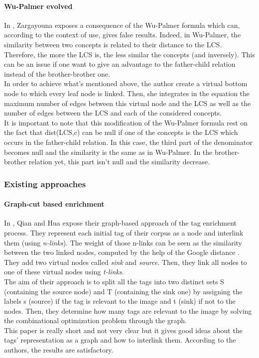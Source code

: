 \paragraph{Wu-Palmer evolved} %
\label{par:wu_palmer_evolved}
In \cite{zara}, Zargayouna exposes a consequence of the Wu-Palmer formula which can, according to the context of use, gives false results. Indeed, in Wu-Palmer, the similarity between two concepts is related to their distance to the LCS. Therefore, the more  the LCS is, the less similar the concepts (and inversely). This can be an issue if one want to give an advantage to the father-child relation instead of the brother-brother one. \\
In order to achieve what's mentioned above, the author create a virtual bottom node to which every leaf node is linked. Then, she integrates in the equation the maximum number of edges between this virtual node and the LCS as well as the number of edges between the LCS and each of the considered concepts. \\
It is important to note that this modification of the Wu-Palmer formula rest on the fact that dist(LCS,c) can be null if one of the concepts is the LCS which occurs in the father-child relation. In this case, the third part of the denominator becomes null and the similarity is the same as in Wu-Palmer. In the brother-brother relation yet, this part isn't null and the similarity decrease.

\subsubsection{Existing approaches} %
\label{ssub:existing_approaches}
\paragraph{Graph-cut based enrichment} %
\label{par:graph_cut_based_enrichment}
In \cite{qian}, Qian and Hua expose their graph-based approach of the tag enrichment process. They represent each initial tag of their corpus as a node and interlink them (using \emph{n-links}). The weight of those n-links can be seen as the similarity between the two linked nodes, computed by the help of the Google distance \cite{cili}. They add two virtual nodes called \emph{sink} and \emph{source}. Then, they link all nodes to one of these virtual nodes using \emph{t-links}.\\
The aim of their approach is to split all the tags into two distinct sets S (containing the source node) and T (containing the sink one) by assigning the labels s (source) if the tag is relevant to the image and t (sink) if not to the nodes. Then, they determine how many tags are relevant to the image by solving the combinational optimization problem through the graph.\\
This paper is really short and not very clear but it gives good ideas about the tags' representation as a graph and how to interlink them. According to the authors, the results are satisfactory.   


